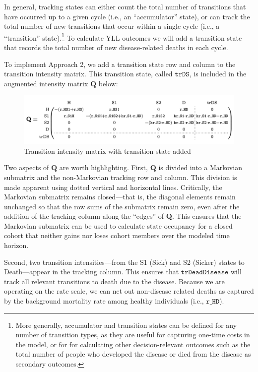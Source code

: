 \documentclass[
]{agujournal2019}
\begin{document}
In general, tracking states can either count the total number of
transitions that have occurred up to a given cycle (i.e., an
``accumulator'' state), or can track the total number of new transitions
that occur within a single cycle (i.e., a ``transition''
state).\footnote{More generally, accumulator and transition states can
  be defined for any number of transition types, as they are useful for
  capturing one-time costs in the model, or for for calculating other
  decision-relevant outcomes such as the total number of people who
  developed the disease or died from the disease as secondary outcomes.}
To calculate YLL outcomes we will add a transition state that records
the total number of new disease-related deaths in each cycle.

To implement Approach 2, we add a transition state row and column to the
transition intensity matrix. This transition state, called
\(\texttt{trDS}\), is included in the augmented intensity matrix
\(\mathbf{Q}\) below:

\begin{figure}[H]

{\centering \includegraphics{images/Q_model1.png}

}

\caption{Transition intensity matrix with transition state added}

\end{figure}%

Two aspects of \(\mathbf{Q}\) are worth highlighting. First,
\(\mathbf{Q}\) is divided into a Markovian submatrix and the
non-Markovian tracking row and column. This division is made apparent
using dotted vertical and horizontal lines. Critically, the Markovian
submatrix remains closed---that is, the diagonal elements remain
unchanged so that the row sums of the submatrix remain zero, even after
the addition of the tracking column along the ``edges'' of
\(\mathbf{Q}\). This ensures that the Markovian submatrix can be used to
calculate state occupancy for a closed cohort that neither gains nor
loses cohort members over the modeled time horizon.

Second, two transition intensities---from the S1 (Sick) and S2 (Sicker)
states to Death---appear in the tracking column. This ensures that
\(\texttt{trDeadDisease}\) will track all relevant transitions to death
due to the disease. Because we are operating on the rate scale, we can
net out non-disease related deaths as captured by the background
mortality rate among healthy individuals (i.e., \(\texttt{r\_HD}\)).
\end{document}

